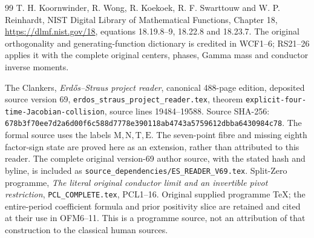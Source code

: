 \documentclass[11pt]{article}
\begin{document}
\begin{thebibliography}{99}
 T. H. Koornwinder, R. Wong, R. Koekoek,
R. F. Swarttouw and W. P. Reinhardt,
NIST Digital Library of Mathematical Functions, Chapter 18,
\url{https://dlmf.nist.gov/18}, equations 18.19.8--9,
18.22.8 and 18.23.7. The original orthogonality and generating-function
dictionary is credited in WCF1--6; RS21--26 applies it with the complete
original centers, phases, Gamma mass and conductor inverse moments.


 The Clankers, \emph{Erd\H{o}s--Straus project reader},
canonical 488-page edition, deposited source version 69,
\texttt{erdos\_straus\_project\_reader.tex}, theorem
\texttt{explicit-four-time-Jacobian-collision}, source lines
19484--19588. Source SHA-256:
\texttt{678b3f70ee7d2a6d00f6c588d7778e390118ab4743a5759612dbba6430984c78}.
The formal source uses the labels $\mathrm M,\mathrm N,\mathrm T,\mathrm E$.
The seven-point fibre and missing eighth factor-sign state are proved
here as an extension, rather than attributed to this reader.
 The complete original version-69 author source,
with the stated hash and byline, is included as
\nolinkurl{source_dependencies/ES_READER_V69.tex}.
 Split-Zero programme,
\emph{The literal original conductor limit and an invertible pivot restriction},
\texttt{PCL\_COMPLETE.tex}, PCL1--16. Original supplied programme TeX;
the entire-period coefficient formula and prior positivity slice are
retained and cited at their use in OFM6--11. This is a programme source,
not an attribution of that construction to the classical human sources.




\end{thebibliography}
\end{document}
